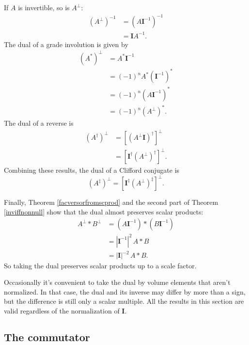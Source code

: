 \documentclass{utarticle}
\newcommand{\bl}[1]{\ensuremath{\bm{#1}}}
\newcommand{\I}{\bl{I}}
\newcommand{\grinv}[2][]{\ensuremath{#2^{*#1}}}
\newcommand{\rev}[1]{\ensuremath{#1^\dagger}}
\newcommand{\clifconj}[1]{\ensuremath{#1^\ddagger}}
\newcommand{\scprod}[2]{\ensuremath{#1 * #2}}
\newcommand{\dual}[1]{\ensuremath{#1^\perp}}
\begin{document}
If $A$ is invertible, so is $\dual{A}$:
\begin{align}
(\dual{A})^{-1} & = (A\I^{-1})^{-1} \nonumber \\
                   & = \I A^{-1}.
\label{dualinv}
\end{align}
The dual of a grade involution is given by
\begin{align}
\dual{(\grinv{A})} & = \grinv{A} \I^{-1} \nonumber \\
                    & = (-1)^{n} \grinv{A} \grinv{(\I^{-1})} \nonumber \\
                    & = (-1)^n \grinv{(A \I^{-1})} \nonumber \\
                    & = (-1)^n \grinv{(\dual{A})}. 
\end{align}
The dual of a reverse is 
\begin{align}
\dual{(\rev{A})} & = \dual{\left[\rev{(\dual{A}\I)}\right]} \nonumber \\
                   & = \dual{\left[\rev{\I} \rev{(\dual{A})}\right]}.
\end{align}
Combining these results,  the dual of a Clifford conjugate is
\begin{equation}
\dual{(\clifconj{A})} =  \dual{\left[\clifconj{\I} \clifconj{(\dual{A})}\right]}.
\end{equation}

Finally, Theorem \ref{facversorfromscprod} and the second part of Theorem \ref{inviffnonnull}
show that the dual almost preserves scalar products:
\begin{align}
\scprod{\dual{A}}{\dual{B}} & = \scprod{(A \I^{-1})}{(B \I^{-1})} \nonumber \\
                                                & = |\I^{-1}|^2 \, \scprod{A}{B} \nonumber \\
                                                & = |\I|^{-2} \, \scprod{A}{B}.
\end{align}
So taking the dual preserves scalar products up to a scale factor.

Occasionally it's convenient to take the dual by volume elements that aren't normalized.  
In that case, the dual and its inverse may differ by more than a sign, but the difference is 
still only a scalar multiple.  All the results in this section are valid regardless of the 
normalization of \I.

\subsection{The commutator}
\label{commute}
\end{document}
